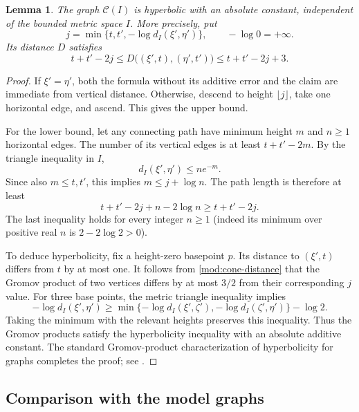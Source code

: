 \documentclass[11pt,reqno]{amsart}
\numberwithin{equation}{section}
\newtheorem{lemma}[theorem]{Lemma}
\theoremstyle{definition}
\theoremstyle{remark}
\begin{document}
\begin{lemma}\label{mod:cone}
The graph $\mathcal C(I)$ is hyperbolic with an absolute constant,
independent of the bounded metric space $I$.  More precisely, put
\[
 j=\min\{t,t',-\log d_I(\xi',\eta')\},
 \qquad -\log0=+\infty.
\]
Its distance $D$ satisfies
\begin{equation}\label{mod:cone-distance}
 t+t'-2j\le
 D\bigl((\xi',t),(\eta',t')\bigr)
 \le t+t'-2j+3.
\end{equation}
\end{lemma}
\begin{proof}
If $\xi'=\eta'$, both the formula without its additive error and
the claim are immediate from vertical distance.  Otherwise,
descend to height $\lfloor j\rfloor$, take one horizontal edge,
and ascend.  This gives the upper bound.

For the lower bound, let any connecting path have minimum height
$m$ and $n\ge1$ horizontal edges.  The number of its vertical
edges is at least $t+t'-2m$.  By the triangle inequality in $I$,
\[
 d_I(\xi',\eta')\le n e^{-m}.
\]
Since also $m\le t,t'$, this implies $m\le j+\log n$.
The path length is therefore at least
\[
 t+t'-2j+n-2\log n\ge t+t'-2j.
\]
The last inequality holds for every integer $n\ge1$ (indeed its
minimum over positive real $n$ is $2-2\log2>0$).

To deduce hyperbolicity, fix a height-zero basepoint $p$.
Its distance to $(\xi',t)$ differs from $t$ by at most one.
It follows from \eqref{mod:cone-distance} that the Gromov product
of two vertices differs by at most $3/2$ from their corresponding
$j$ value.  For three base points, the metric triangle inequality
implies
\[
 -\log d_I(\xi',\eta')
 \ge\min\{-\log d_I(\xi',\zeta'),
                -\log d_I(\zeta',\eta')\}-\log2.
\]
Taking the minimum with the relevant heights preserves this
inequality.  Thus the Gromov products satisfy the hyperbolicity
inequality with an absolute additive constant.  The standard
Gromov-product characterization of hyperbolicity for graphs
completes the proof; see \cite[Chapter~III.H]{BridsonHaefliger}.
\end{proof}

\subsection{Comparison with the model graphs}
\end{document}
